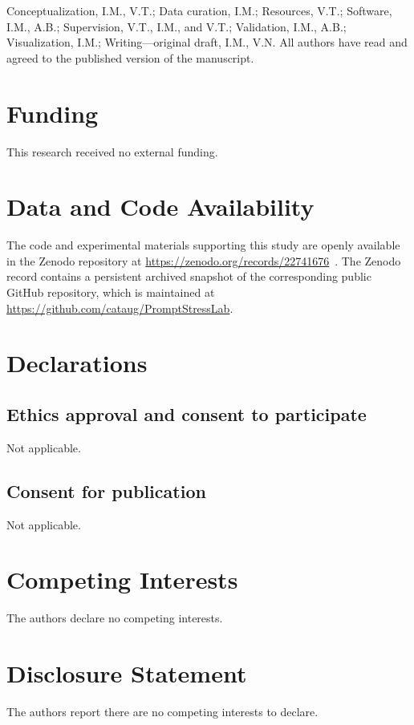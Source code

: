 \documentclass[fleqn,10pt]{wlscirep-authoryear}
\begin{document}
Conceptualization, I.M., V.T.; Data curation, I.M.; Resources, V.T.; Software, I.M., A.B.; Supervision, V.T., I.M., and V.T.; Validation, I.M., A.B.; Visualization, I.M.; Writing---original draft, I.M., V.N. All authors have read and agreed to the published version of the manuscript.

\section*{Funding}

This research received no external funding.

\section*{Data and Code Availability}

The code and experimental materials supporting this study are openly available
in the Zenodo repository at
\url{https://zenodo.org/records/22741676}~\cite{promptstresslab2026}.
The Zenodo record contains a persistent archived snapshot of the corresponding
public GitHub repository, which is maintained at
\url{https://github.com/cataug/PromptStressLab}.


\section*{Declarations}

\subsection*{Ethics approval and consent to participate}
Not applicable.

\subsection*{Consent for publication}
Not applicable.

\section*{Competing Interests}
The authors declare no competing interests.

\section*{Disclosure Statement}

The authors report there are no competing interests to declare.
\end{document}
